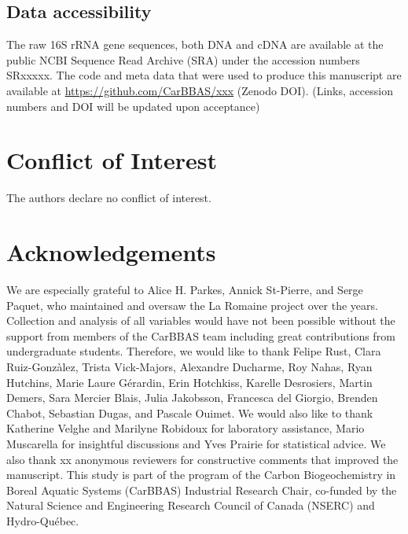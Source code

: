 \documentclass[12pt,a4paper]{article} %
\begin{document}
\subsection*{Data accessibility}
The raw 16S rRNA gene sequences, both DNA and cDNA are available at the public NCBI Sequence Read Archive (SRA) under the accession numbers SRxxxxx. The code and meta data that were used to produce this manuscript are available at \url{https://github.com/CarBBAS/xxx} (Zenodo DOI). (Links, accession numbers and DOI will be updated upon acceptance) \\

\section*{Conflict of Interest}
The authors declare no conflict of interest.

\section*{Acknowledgements}
We are especially grateful to Alice H. Parkes, Annick St-Pierre, and Serge Paquet, who maintained and oversaw the La Romaine project over the years. Collection and analysis of all variables would have not been possible without the support from members of the CarBBAS team including great contributions from undergraduate students. Therefore, we would like to thank Felipe Rust, Clara Ruiz-Gonz\`{a}lez, Trista Vick-Majors, Alexandre Ducharme, Roy Nahas, Ryan Hutchins, Marie Laure G\'{e}rardin,  Erin Hotchkiss, Karelle Desrosiers, Martin Demers, Sara Mercier Blais, Julia Jakobsson, Francesca del Giorgio, Brenden Chabot, Sebastian Dugas, and Pascale Ouimet. We would also like to thank Katherine Velghe and Marilyne Robidoux for laboratory assistance, Mario Muscarella for insightful discussions and Yves Prairie for statistical advice. We also thank xx anonymous reviewers for constructive comments that improved the manuscript. This study is part of the program of the Carbon Biogeochemistry in Boreal Aquatic Systems (CarBBAS) Industrial Research Chair, co-funded by the Natural Science and Engineering Research Council of Canada (NSERC) and Hydro-Qu\'{e}bec.

\newpage
\singlespacing



\newpage
\end{document}
